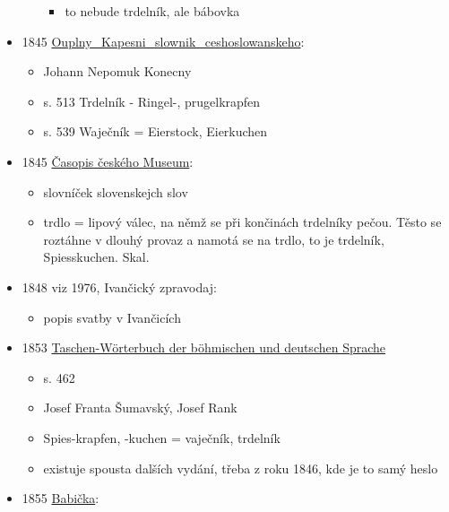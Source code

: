 \begin{itemize}
\begin{itemize}
    \begin{itemize}
    \tightlist
    \item
      to nebude trdelník, ale bábovka
    \end{itemize}
  \end{itemize}
\item
  1845
  \href{https://www.google.cz/books/edition/Ouplny_Kapesni_slownik_ceshoslowanskeho/i8dUAAAAcAAJ?hl=cs&gbpv=1&dq=trdeln\%C3\%ADk&pg=PA513&printsec=frontcover}{Ouplny\_Kapesni\_slownik\_ceshoslowanskeho}:

  \begin{itemize}
  \tightlist
  \item
    Johann Nepomuk Konecny
  \item
    s. 513 Trdelník - Ringel-, prugelkrapfen
  \item
    s. 539 Waječník = Eierstock, Eierkuchen
  \end{itemize}
\item
  1845
  \href{https://ceskadigitalniknihovna.cz/view/uuid:f683dda0-81be-11de-9a7b-000d606f5dc6?page=uuid:5a5cbb90-7ff7-11de-8619-000d606f5dc6&fulltext=trdeln\%C3\%ADk\%20OR\%20trdeln\%C3\%ADky\%20OR\%20trdeln\%C3\%ADku\%20&source=cbvk}{Časopis
  českého Museum}:

  \begin{itemize}
  \tightlist
  \item
    slovníček slovenskejch slov
  \item
    trdlo = lipový válec, na němž se při končinách trdelníky pečou.
    Těsto se roztáhne v dlouhý provaz a namotá se na trdlo, to je
    trdelník, Spiesskuchen. Skal.
  \end{itemize}
\item
  1848 viz 1976, Ivančický zpravodaj:

  \begin{itemize}
  \tightlist
  \item
    popis svatby v Ivančicích
  \end{itemize}
\item
  1853
  \href{https://www.google.cz/books/edition/Taschen_W\%C3\%B6rterbuch_der_b\%C3\%B6hmischen_und/tDlFAAAAYAAJ?hl=cs&gbpv=1&dq=trdeln\%C3\%ADk&pg=PA462&printsec=frontcover}{Taschen-Wörterbuch
  der böhmischen und deutschen Sprache}

  \begin{itemize}
  \tightlist
  \item
    s. 462
  \item
    Josef Franta Šumavský, Josef Rank
  \item
    Spies-krapfen, -kuchen = vaječník, trdelník
  \item
    existuje spousta dalších vydání, třeba z roku 1846, kde je to samý
    heslo
  \end{itemize}
\item
  1855
  \href{https://ceskadigitalniknihovna.cz/uuid/uuid:2f58bcf0-f6ae-11dd-8224-000d606f5dc6}{Babička}:


\end{itemize}
